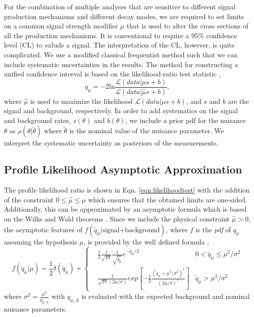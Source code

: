 For the combination of multiple analyses that are sensitive to different signal production mechanisms and different decay modes, we are required to set limits on a common signal strength modifier $\mu$ that is used to alter the cross sections of all the production mechanisms. It is conventional to require a 95\% confidence level (CL) to exlude a signal. The interpretation of the CL, however, is quite complicated. We use a modified classical frequentist method such that we can include systematic uncertainties in the results. The method for constructing a unified confidence interval is based on the likelihood-ratio test statistic \cite{feldman_unified_1998}, 
\begin{equation}\label{eqn:likelihoodtest}
q_\mu=-2\text{ln}\frac{\mathcal{L}(data|\mu s+b)}{\mathcal{L}(data|\hat{\mu} s+b)},
\end{equation}
where $\hat{\mu}$ is used to maximize the likelihood $\mathcal{L}(data|\mu s+b)$, and $s$ and $b$ are the signal and background, respectively. In order to add systematics on the signal and background rates, $s(\theta)$ and $b(\theta)$, we include a prior pdf for the nuisance $\theta$ as $\rho(\theta|\widetilde{\theta})$ where $\widetilde{\theta}$ is the nominal value of the nuisance parameter. We interpret the systematic uncertainty as posteriors of the measurements. 

\subsection{Profile Likelihood Asymptotic Approximation}\label{subsec:Asymptotic}

The profile likelihood ratio is shown in Eqn. \ref{eqn:likelihoodtest} with the addition of the constraint $0\leq\widehat{\mu}\leq\mu$ which ensures that the obtained limits are one-sided. Additionally, this can be approximated by an asymptotic formula which is based on the Wilks and Wald theorems \cite{cowan_asymptotic_2011}. Since we include the physical constraint $\widehat{\mu}>0$, the asymptotic features of $f(\widetilde{q}_\mu|\text{signal+background})$, where $f$ is the \textit{pdf} of $q_\mu$ assuming the hypothesis $\mu$, is provided by the well defined formula \cite{cowan_asymptotic_2011}, 
\begin{equation}\label{eqn:profileLikelihood}
f(\widetilde{q}_\mu|\mu)=\frac{1}{2}\delta(\widetilde{q}_\mu)+\left\{
\begin{split}
&\frac{1}{2}\frac{1}{\sqrt{2\pi}}\frac{1}{\sqrt{\widetilde{q}_\mu}}e^{-\widetilde{q}_\mu/2} & 0<\widetilde{q}_\mu\leq\mu^2/\sigma^2 \\
&\frac{1}{\sqrt{2\pi}(2\mu/\sigma)}exp[-\frac{1}{2}\frac{(\widetilde{q}_\mu+\mu^2/\sigma^2)^2}{(2\mu/\sigma)^2}] & \widetilde{q}_\mu>\mu^2/\sigma^2
\end{split}
\end{equation}
where $\sigma^2=\frac{\mu^2}{q_{\mu,A}}$ with $q_{\mu,A}$ is evaluated with the expected background and nominal nuisance parameters. 

